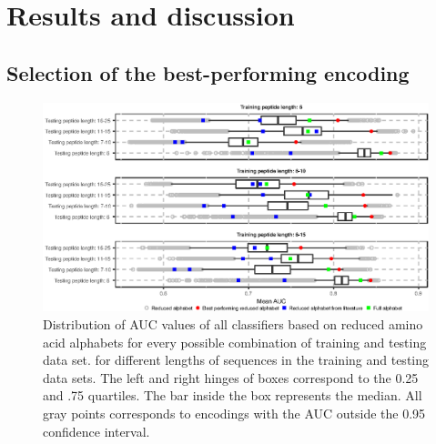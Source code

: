 \documentclass[a4,center,fleqn]{NAR}
\begin{document}
\section{Results and discussion}

\subsection{Selection of the best-performing encoding}

\begin{figure}[!tpb]
\centerline{\includegraphics{figures/AUC_boxplot.eps}}
\caption{Distribution of AUC values of all classifiers based on reduced amino acid 
alphabets for every possible combination of training and testing data set. 
%
%
%
%
%
%
%
for different lengths of sequences in the training and testing data sets. 
The left and right hinges of boxes correspond to the 0.25 and .75 quartiles. 
The bar inside the box represents the median. All gray points corresponds to
encodings with the AUC outside the 0.95 confidence interval. 
}\label{fig:AUC_boxplot} 
\end{figure}
\end{document}

